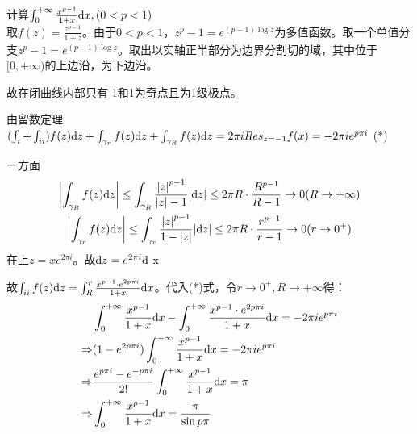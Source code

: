 \begin{eg}
	\color{blue}计算$\int_0^{+\infty}\frac{x^{p-1}}{1+x}\mathrm{d}x,(0<p<1) $\color{black}\\
	取$f(z)=\frac{z^{p-1}}{1+z}$。由于$0<p<1$，$z^p-1=e^{(p-1)\log z}$为多值函数。取一个单值分支$z^p-1=e^{(p-1)\log z}$。取出以实轴正半部分为边界分割切的域，其中\uppercase\expandafter{}位于$[0,+\infty)$的上边沿，\uppercase\expandafter{}为下边沿。\par
	故在闭曲线内部只有-1和1为奇点且为1级极点。\par
	由留数定理$(\int_{\uppercase\expandafter{\romannumeral1}}+\int_{\uppercase\expandafter{\romannumeral2}})f(z)\di z +\int_{\gamma_r}f(z)\di z+\int_{\gamma_R}f(z)\di z=2\pi i Res_{z=-1}f(x)=-2\pi i e^{p \pi i}$ (*)\par
	一方面
	\begin{gather*}
		\left| \int_{\gamma_R}f(z)\mathrm{d}z \right| \le \int_{\gamma_R}\frac{\left| z\right| ^{p-1}}{\left| z\right| -1} {\left| \mathrm{d}z\right|}\le 2\pi R\cdot \frac{R^{p-1}}{R-1}\to 0(R\to +\infty)\\ \left| \int_{\gamma_r}f(z)\mathrm{d}z \right| \le \int_{\gamma_r}\frac{\left| z\right| ^{p-1}}{1 - \left| z\right| } {\left| \mathrm{d}z\right|}\le 2\pi R\cdot \frac{r^{p-1}}{r-1}\to 0(r\to 0^+)
	\end{gather*}
	在\uppercase\expandafter{}上$z=xe^{2\pi i}$。故$\di z=e^{2\pi i}\di$ x\par
	故$\int_{\uppercase\expandafter{\romannumeral2}}f(z)\di z=\int_R^r \frac{x^{p-1}\cdot e^{2p\pi i}}{1+x}\di x$。代入(*)式，令$r\to 0^+, R\to + \infty$得：
	\begin{align*}
		&\int_0^{+ \infty} \frac{x^{p-1}}{1+x}\mathrm{d}x - \int_0^{+ \infty} \frac{x^{p-1}\cdot e^{2p\pi i}}{1+x}\mathrm{d}x =-2\pi i e^{p \pi i}\\
		\Rightarrow &(1-e^{2p\pi i})\int_0^{+\infty}\frac{x^{p-1}}{1+x}\mathrm{d}x=-2\pi i e^{p \pi i}\\
		\Rightarrow &\frac{e^{p\pi i}-e^{-p\pi i}}{2!}\int_0^{+\infty}\frac{x^{p-1}}{1+x}\mathrm{d}x=\pi\\
		\Rightarrow &\int_0^{+\infty}\frac{x^{p-1}}{1+x}\mathrm{d}x=\frac{\pi}{\sin  p\pi}
	\end{align*}
\end{eg}